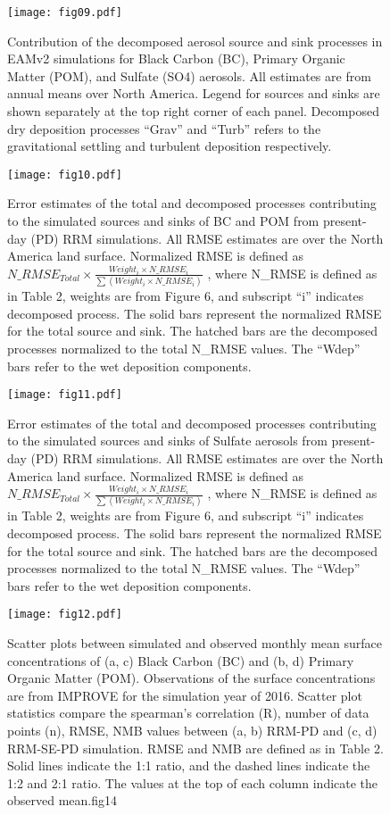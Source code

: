 \documentclass[journal abbreviation, manuscript]{copernicus}
\begin{document}
\clearpage
\begin{figure}[t]
\texttt{[image: fig09.pdf]}
\caption{Contribution of the decomposed aerosol source and sink processes in EAMv2 simulations for Black Carbon (BC), Primary Organic Matter (POM), and Sulfate (SO4) aerosols. All estimates are from annual means over North America. Legend for sources and sinks are shown separately at the top right corner of each panel. Decomposed dry deposition processes “Grav” and “Turb” refers to the gravitational settling and turbulent deposition respectively.}
\end{figure}

\clearpage
\begin{figure}[t]
\texttt{[image: fig10.pdf]}
\caption{Error estimates of the total and decomposed processes contributing to the simulated sources and sinks of BC and POM from present-day (PD) RRM simulations. All RMSE estimates are over the North America land surface. Normalized RMSE is defined as $N\_RMSE_{Total} \times \frac{Weight_{i} \times N\_RMSE_{i}}{\sum{(Weight_{i} \times N\_RMSE_{i})}}$ , where N\_RMSE is defined as in Table 2, weights are from Figure 6, and subscript “i” indicates decomposed process. The solid bars represent the normalized RMSE for the total source and sink. The hatched bars are the decomposed processes normalized to the total N\_RMSE values. The “Wdep” bars refer to the wet deposition components.}
\end{figure}

\clearpage
\begin{figure}[t]
\texttt{[image: fig11.pdf]}
\caption{Error estimates of the total and decomposed processes contributing to the simulated sources and sinks of Sulfate aerosols from present-day (PD) RRM simulations. All RMSE estimates are over the North America land surface. Normalized RMSE is defined as $N\_RMSE_{Total} \times \frac{Weight_{i} \times N\_RMSE_{i}}{\sum{(Weight_{i} \times N\_RMSE_{i})}}$ , where N\_RMSE is defined as in Table 2, weights are from Figure 6, and subscript “i” indicates decomposed process. The solid bars represent the normalized RMSE for the total source and sink. The hatched bars are the decomposed processes normalized to the total N\_RMSE values. The “Wdep” bars refer to the wet deposition components.}
\end{figure}

\clearpage
\begin{figure}[t]
\texttt{[image: fig12.pdf]}
\caption{Scatter plots between simulated and observed monthly mean surface concentrations of (a, c) Black Carbon (BC) and (b, d) Primary Organic Matter (POM). Observations of the surface concentrations are from IMPROVE for the simulation year of 2016. Scatter plot statistics compare the spearman’s correlation (R), number of data points (n), RMSE, NMB values between (a, b) RRM-PD and (c, d) RRM-SE-PD simulation. RMSE and NMB are defined as in Table 2. Solid lines indicate the 1:1 ratio, and the dashed lines indicate the 1:2 and 2:1 ratio. The values at the top of each column indicate the observed mean.fig14}
\end{figure}
\end{document}
